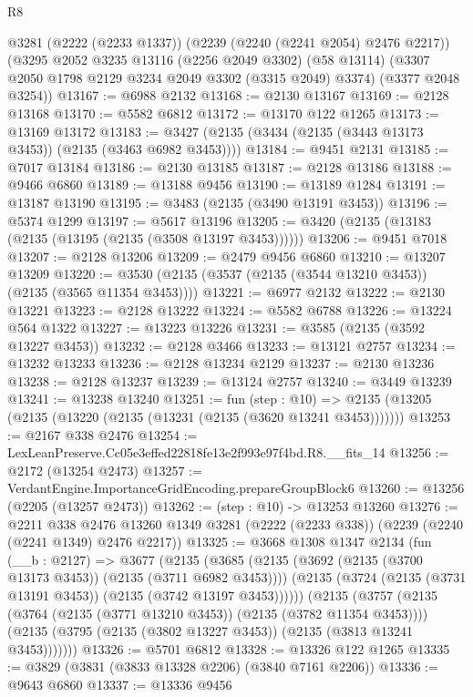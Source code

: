 \begin{lexlean}{R8}
\begin{coremodule}
    @3281
    (@2222 (@2233 @1337))
    (@2239 (@2240 (@2241 @2054) @2476 @2217))
    (@3295
      @2052
      @3235
      @13116
      (@2256 @2049 @3302)
      (@58 @13114)
      (@3307 @2050 @1798 @2129 @3234 @2049 @3302 (@3315 @2049) @3374)
      (@3377 @2048 @3254))
@13167 := @6988 @2132
@13168 := @2130 @13167
@13169 := @2128 @13168
@13170 := @5582 @6812
@13172 := @13170 @122 @1265
@13173 := @13169 @13172
@13183 := @3427 (@2135 (@3434 (@2135 (@3443 @13173 @3453)) (@2135 (@3463 @6982 @3453))))
@13184 := @9451 @2131
@13185 := @7017 @13184
@13186 := @2130 @13185
@13187 := @2128 @13186
@13188 := @9466 @6860
@13189 := @13188 @9456
@13190 := @13189 @1284
@13191 := @13187 @13190
@13195 := @3483 (@2135 (@3490 @13191 @3453))
@13196 := @5374 @1299
@13197 := @5617 @13196
@13205 := @3420 (@2135 (@13183 (@2135 (@13195 (@2135 (@3508 @13197 @3453))))))
@13206 := @9451 @7018
@13207 := @2128 @13206
@13209 := @2479 @9456 @6860
@13210 := @13207 @13209
@13220 := @3530 (@2135 (@3537 (@2135 (@3544 @13210 @3453)) (@2135 (@3565 @11354 @3453))))
@13221 := @6977 @2132
@13222 := @2130 @13221
@13223 := @2128 @13222
@13224 := @5582 @6788
@13226 := @13224 @564 @1322
@13227 := @13223 @13226
@13231 := @3585 (@2135 (@3592 @13227 @3453))
@13232 := @2128 @3466
@13233 := @13121 @2757
@13234 := @13232 @13233
@13236 := @2128 @13234 @2129
@13237 := @2130 @13236
@13238 := @2128 @13237
@13239 := @13124 @2757
@13240 := @3449 @13239
@13241 := @13238 @13240
@13251 := fun (step : @10) =>
  @2135 (@13205 (@2135 (@13220 (@2135 (@13231 (@2135 (@3620 @13241 @3453)))))))
@13253 := @2167 @338 @2476
@13254 := LexLeanPreserve.Cc05e3effed22818fe13e2f993e97f4bd.R8.__fits_14
@13256 := @2172 (@13254 @2473)
@13257 := VerdantEngine.ImportanceGridEncoding.prepareGroupBlock6
@13260 := @13256 (@2205 (@13257 @2473))
@13262 := (step : @10) -> @13253 @13260
@13276 := @2211
    @338
    @2476
    @13260
    @1349
    @3281
    (@2222 (@2233 @338))
    (@2239 (@2240 (@2241 @1349) @2476 @2217))
@13325 := @3668
    @1308
    @1347
    @2134
    (fun (__b : @2127) =>
    @3677
      (@2135
        (@3685
          (@2135 (@3692 (@2135 (@3700 @13173 @3453)) (@2135 (@3711 @6982 @3453))))
          (@2135 (@3724 (@2135 (@3731 @13191 @3453)) (@2135 (@3742 @13197 @3453))))))
      (@2135
        (@3757
          (@2135 (@3764 (@2135 (@3771 @13210 @3453)) (@2135 (@3782 @11354 @3453))))
          (@2135 (@3795 (@2135 (@3802 @13227 @3453)) (@2135 (@3813 @13241 @3453)))))))
@13326 := @5701 @6812
@13328 := @13326 @122 @1265
@13335 := @3829 (@3831 (@3833 @13328 @2206) (@3840 @7161 @2206))
@13336 := @9643 @6860
@13337 := @13336 @9456

\end{coremodule}
\end{lexlean}
